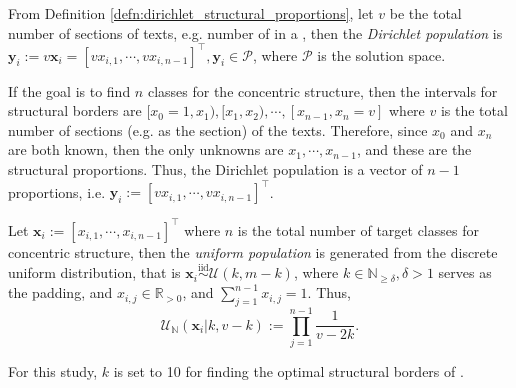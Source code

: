 \begin{defn}\label{defn:dirichlet_population}
    From Definition \ref{defn:dirichlet_structural_proportions}, let $v$ be the total number of sections of texts, e.g. number of   in a  , then the \textit{Dirichlet population} is $\mathbf{y}_i:=v\mathbf{x}_i=[vx_{i,1},\cdots,vx_{i,n-1}]^{\top},\mathbf{y}_i\in\mathscr{P}$, where $\mathscr{P}$ is the solution space.
\end{defn}
\begin{remark}
    If the goal is to find $n$ classes for the concentric structure, then the intervals for structural borders are $[x_0=1,x_1),[x_1,x_2),\cdots,[x_{n-1},x_n=v]$ where $v$ is the total number of sections (e.g.  \textnormal{} as the section) of the texts. Therefore, since $x_0$ and $x_n$ are both known, then the only unknowns are $x_1,\cdots,x_{n-1}$, and these are the structural proportions. Thus, the Dirichlet population is a vector of $n-1$ proportions, i.e. $\mathbf{y}_i:=[vx_{i,1},\cdots,vx_{i,n-1}]^{\top}$.
\end{remark}
\begin{defn}\label{defn:discrete_uniform_population}
    Let $\mathbf{x}_i:=[x_{i,1},\cdots,x_{i,n-1}]^{\top}$ where $n$ is the total number of target classes for concentric structure, then the \textit{uniform population} is generated from the discrete uniform distribution, that is $\mathbf{x}_i\overset{\text{iid}}{\sim}\mathcal{U}(k,m-k)$, where $k\in\mathbb{N}_{\geq \delta},\delta>1$ serves as the padding, and $x_{i,j}\in\mathbb{R}_{>0}$, and $\sum_{j=1}^{n-1}x_{i,j}=1$. Thus,
    \begin{equation}
        \mathcal{U}_{\mathbb{N}}(\mathbf{x}_i|k,v-k):=\prod_{j=1}^{n-1}\frac{1}{v-2k}.
    \end{equation}
\end{defn}
\begin{remark}
    For this study, $k$ is set to 10 for finding the optimal structural borders of  \textnormal{}.
\end{remark}

